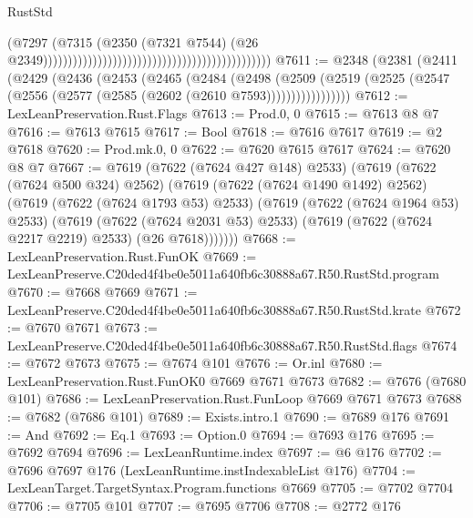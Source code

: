 \begin{lexlean}{RustStd}
\begin{coremodule}
                                                                                        (@7297
                                                                                          (@7315
                                                                                            (@2350
                                                                                              (@7321
                                                                                                @7544)
                                                                                              (@26
                                                                                                @2349))))))))))))))))))))))))))))))))))))))))))))))
@7611 := @2348
    (@2381
      (@2411
        (@2429
          (@2436
            (@2453
              (@2465
                (@2484
                  (@2498
                    (@2509
                      (@2519 (@2525 (@2547 (@2556 (@2577 (@2585 (@2602 (@2610 @7593)))))))))))))))))
@7612 := LexLeanPreservation.Rust.Flags
@7613 := Prod.{0, 0}
@7615 := @7613 @8 @7
@7616 := @7613 @7615
@7617 := Bool
@7618 := @7616 @7617
@7619 := @2 @7618
@7620 := Prod.mk.{0, 0}
@7622 := @7620 @7615 @7617
@7624 := @7620 @8 @7
@7667 := @7619
    (@7622 (@7624 @427 @148) @2533)
    (@7619
      (@7622 (@7624 @500 @324) @2562)
      (@7619
        (@7622 (@7624 @1490 @1492) @2562)
        (@7619
          (@7622 (@7624 @1793 @53) @2533)
          (@7619
            (@7622 (@7624 @1964 @53) @2533)
            (@7619
              (@7622 (@7624 @2031 @53) @2533)
              (@7619 (@7622 (@7624 @2217 @2219) @2533) (@26 @7618)))))))
@7668 := LexLeanPreservation.Rust.FunOK
@7669 := LexLeanPreserve.C20ded4f4be0e5011a640fb6c30888a67.R50.RustStd.program
@7670 := @7668 @7669
@7671 := LexLeanPreserve.C20ded4f4be0e5011a640fb6c30888a67.R50.RustStd.krate
@7672 := @7670 @7671
@7673 := LexLeanPreserve.C20ded4f4be0e5011a640fb6c30888a67.R50.RustStd.flags
@7674 := @7672 @7673
@7675 := @7674 @101
@7676 := Or.inl
@7680 := LexLeanPreservation.Rust.FunOK0 @7669 @7671 @7673
@7682 := @7676 (@7680 @101)
@7686 := LexLeanPreservation.Rust.FunLoop @7669 @7671 @7673
@7688 := @7682 (@7686 @101)
@7689 := Exists.intro.{1}
@7690 := @7689 @176
@7691 := And
@7692 := Eq.{1}
@7693 := Option.{0}
@7694 := @7693 @176
@7695 := @7692 @7694
@7696 := LexLeanRuntime.index
@7697 := @6 @176
@7702 := @7696 @7697 @176 (LexLeanRuntime.instIndexableList @176)
@7704 := LexLeanTarget.TargetSyntax.Program.functions @7669
@7705 := @7702 @7704
@7706 := @7705 @101
@7707 := @7695 @7706
@7708 := @2772 @176

\end{coremodule}
\end{lexlean}
